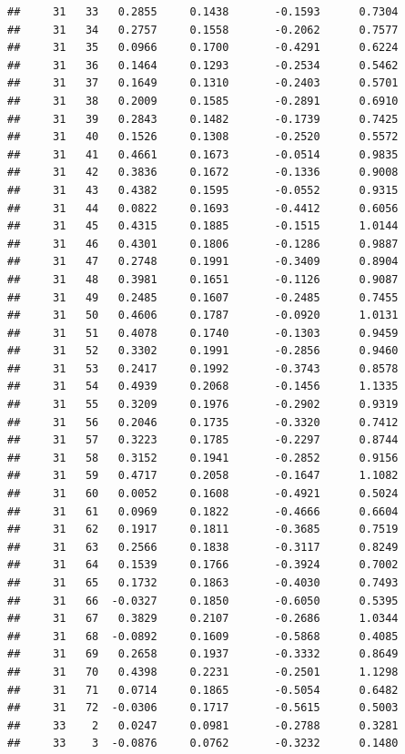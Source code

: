 \documentclass[
]{article}
\begin{document}
\begin{verbatim}
##     31   33   0.2855     0.1438       -0.1593      0.7304  
##     31   34   0.2757     0.1558       -0.2062      0.7577  
##     31   35   0.0966     0.1700       -0.4291      0.6224  
##     31   36   0.1464     0.1293       -0.2534      0.5462  
##     31   37   0.1649     0.1310       -0.2403      0.5701  
##     31   38   0.2009     0.1585       -0.2891      0.6910  
##     31   39   0.2843     0.1482       -0.1739      0.7425  
##     31   40   0.1526     0.1308       -0.2520      0.5572  
##     31   41   0.4661     0.1673       -0.0514      0.9835  
##     31   42   0.3836     0.1672       -0.1336      0.9008  
##     31   43   0.4382     0.1595       -0.0552      0.9315  
##     31   44   0.0822     0.1693       -0.4412      0.6056  
##     31   45   0.4315     0.1885       -0.1515      1.0144  
##     31   46   0.4301     0.1806       -0.1286      0.9887  
##     31   47   0.2748     0.1991       -0.3409      0.8904  
##     31   48   0.3981     0.1651       -0.1126      0.9087  
##     31   49   0.2485     0.1607       -0.2485      0.7455  
##     31   50   0.4606     0.1787       -0.0920      1.0131  
##     31   51   0.4078     0.1740       -0.1303      0.9459  
##     31   52   0.3302     0.1991       -0.2856      0.9460  
##     31   53   0.2417     0.1992       -0.3743      0.8578  
##     31   54   0.4939     0.2068       -0.1456      1.1335  
##     31   55   0.3209     0.1976       -0.2902      0.9319  
##     31   56   0.2046     0.1735       -0.3320      0.7412  
##     31   57   0.3223     0.1785       -0.2297      0.8744  
##     31   58   0.3152     0.1941       -0.2852      0.9156  
##     31   59   0.4717     0.2058       -0.1647      1.1082  
##     31   60   0.0052     0.1608       -0.4921      0.5024  
##     31   61   0.0969     0.1822       -0.4666      0.6604  
##     31   62   0.1917     0.1811       -0.3685      0.7519  
##     31   63   0.2566     0.1838       -0.3117      0.8249  
##     31   64   0.1539     0.1766       -0.3924      0.7002  
##     31   65   0.1732     0.1863       -0.4030      0.7493  
##     31   66  -0.0327     0.1850       -0.6050      0.5395  
##     31   67   0.3829     0.2107       -0.2686      1.0344  
##     31   68  -0.0892     0.1609       -0.5868      0.4085  
##     31   69   0.2658     0.1937       -0.3332      0.8649  
##     31   70   0.4398     0.2231       -0.2501      1.1298  
##     31   71   0.0714     0.1865       -0.5054      0.6482  
##     31   72  -0.0306     0.1717       -0.5615      0.5003  
##     33    2   0.0247     0.0981       -0.2788      0.3281  
##     33    3  -0.0876     0.0762       -0.3232      0.1480  

\end{verbatim}
\end{document}
